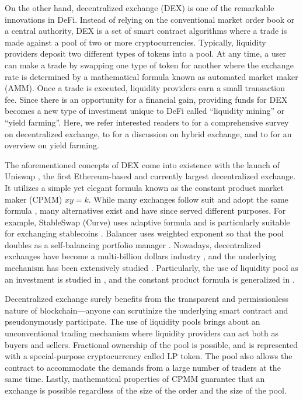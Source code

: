 \documentclass[12pt,a4paper]{article}
\begin{document}
On the other hand, decentralized exchange (DEX) is one of the remarkable innovations in DeFi. Instead of relying on the conventional market order book or a central authority, DEX is a set of smart contract algorithms where a trade is made against a pool of two or more cryptocurrencies. Typically, liquidity providers deposit two different types of tokens into a pool. At any time, a user can make a trade by swapping one type of token for another where the exchange rate is determined by a mathematical formula known as automated market maker (AMM). Once a trade is executed, liquidity providers earn a small transaction fee. Since there is an opportunity for a financial gain, providing funds for DEX becomes a new type of investment unique to DeFi called ``liquidity mining'' or ``yield farming''. Here, we refer interested readers to \cite{XPCF} for a comprehensive survey on decentralized exchange, to \cite{LWCLL} for a discussion on hybrid exchange, and to \cite{XF} for an overview on yield farming.

The aforementioned concepts of DEX come into existence with the launch of Uniswap \cite{A,AZR,AZSKR}, the first Ethereum-based and currently largest \cite{D} decentralized exchange. It utilizes a simple yet elegant formula known as the constant product market maker (CPMM) $xy=k$. While many exchanges follow suit and adopt the same formula \cite{P,Q,S}, many alternatives exist and have since served different purposes. For example, StableSwap (Curve) uses adaptive formula and is particularly suitable for exchanging stablecoins \cite{E}. Balancer uses weighted exponent so that the pool doubles as a self-balancing portfolio manager \cite{MM}. Nowadays, decentralized exchanges have become a multi-billion dollars industry \cite{C}, and the underlying mechanism has been extensively studied \cite{XPCF,AEC,AKCNC,TPL}. Particularly, the use of liquidity pool as an investment is studied in \cite{F,WK}, and the constant product formula is generalized in \cite{FK,KFG}.

Decentralized exchange surely benefits from the transparent and permissionless nature of blockchain---anyone can scrutinize the underlying smart contract and pseudonymously participate. The use of liquidity pools brings about an unconventional trading mechanism where liquidity providers can act both as buyers and sellers. Fractional ownership of the pool is possible, and is represented with a special-purpose cryptocurrency called LP token. The pool also allows the contract to accommodate the demands from a large number of traders at the same time. Lastly, mathematical properties of CPMM guarantee that an exchange is possible regardless of the size of the order and the size of the pool.
\end{document}
